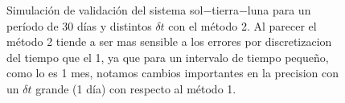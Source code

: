 \begin{figure}
{	\label{fig:ej1_m2_30_12}
	}
	\caption{
		Simulación de validación del sistema sol$-$tierra$-$luna para un período de 30 días y distintos $\delta t$
		con el método 2.
		Al parecer el método 2 tiende a ser mas sensible a los errores por discretizacion del tiempo que el 1,
		ya que para un intervalo de tiempo pequeño, como lo es 1 mes,
		notamos cambios importantes en la precision con un $\delta t$ grande (1 día) con respecto al método 1.
	}
	\label{ fig:res_ej1_m2_30 }
\end{figure}
